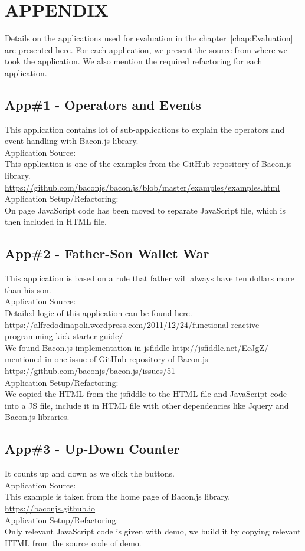 \chapter{APPENDIX} \label{chap:Appendix}
Details on the applications used for evaluation in the chapter~\ref{chap:Evaluation} are presented here. For each application, we present the source from where we took the application. We also mention the required refactoring for each application.
\section{App\#1 - Operators and Events}
This application contains lot of sub-applications to explain the operators and event handling with Bacon.js library.\\
Application Source:\\ 
This application is one of the examples from the GitHub repository of Bacon.js library.\\
\url{https://github.com/baconjs/bacon.js/blob/master/examples/examples.html}\\
Application Setup/Refactoring: \\
On page JavaScript code has been moved to separate JavaScript file, which is then included in HTML file.

\section{App\#2 - Father-Son Wallet War}
This application is based on a rule that father will always have ten dollars more than his son.\\
Application Source:\\ 
Detailed logic of this application can be found here.\\ \url{https://alfredodinapoli.wordpress.com/2011/12/24/functional-reactive-programming-kick-starter-guide/}\\
We found Bacon.js implementation in jsfiddle \url{http://jsfiddle.net/EeJgZ/} mentioned in one issue of GitHub repository of Bacon.js\\
\url{https://github.com/baconjs/bacon.js/issues/51}\\
Application Setup/Refactoring: \\
We copied the HTML from the jsfiddle to the HTML file and JavaScript code into a JS file, include it in HTML file with other dependencies like Jquery and Bacon.js libraries.

\section{App\#3 - Up-Down Counter}
It counts up and down as we click the buttons.\\
Application Source: \\
This example is taken from the home page of Bacon.js library.\\
\url{https://baconjs.github.io}\\
Application Setup/Refactoring: \\
Only relevant JavaScript code is given with demo, we build it by copying relevant HTML from the source code of demo. 

